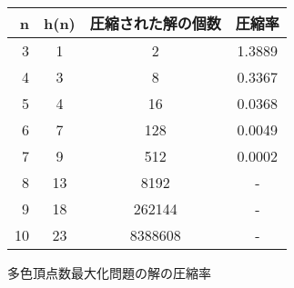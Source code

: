 \begin{tabular}{r|c|c|c}
 \hline
 n& h(n)& 圧縮された解の個数& 圧縮率 \\
 \hline
 3&	1&	2&	1.3889 \\
 4&	3&	8&	0.3367 \\
 5&	4&	16&	0.0368 \\
 6&	7&	128&	0.0049 \\
 7&	9&	512&	0.0002 \\
 8&	13&	8192&	- \\
 9&	18&	262144&	- \\
 10&	23&	8388608&	- \\
\end{tabular}
\caption{多色頂点数最大化問題の解の圧縮率}
\label{table:com}